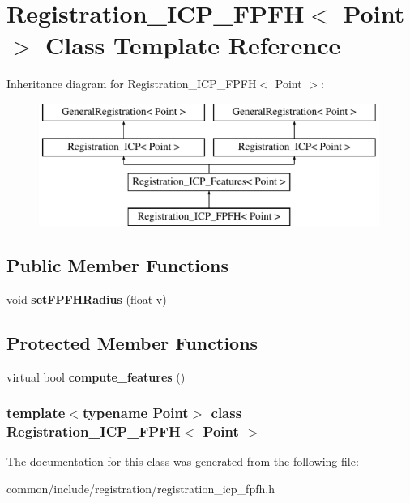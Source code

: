 \hypertarget{classRegistration__ICP__FPFH}{
\section{Registration\_\-ICP\_\-FPFH$<$ Point $>$ Class Template Reference}
\label{classRegistration__ICP__FPFH}
}
Inheritance diagram for Registration\_\-ICP\_\-FPFH$<$ Point $>$:\begin{figure}[H]
\begin{center}
\leavevmode
\includegraphics[height=4.000000cm]{classRegistration__ICP__FPFH}
\end{center}
\end{figure}
\subsection*{Public Member Functions}
\begin{DoxyCompactItemize}
\item 
\hypertarget{classRegistration__ICP__FPFH_ac6120c9fc679004668f6e4b16e31ac2b}{
void {\bfseries setFPFHRadius} (float v)}
\label{classRegistration__ICP__FPFH_ac6120c9fc679004668f6e4b16e31ac2b}

\end{DoxyCompactItemize}
\subsection*{Protected Member Functions}
\begin{DoxyCompactItemize}
\item 
\hypertarget{classRegistration__ICP__FPFH_afb888c0b3890e282cc6632f0db513ee7}{
virtual bool {\bfseries compute\_\-features} ()}
\label{classRegistration__ICP__FPFH_afb888c0b3890e282cc6632f0db513ee7}

\end{DoxyCompactItemize}
\subsubsection*{template$<$typename Point$>$ class Registration\_\-ICP\_\-FPFH$<$ Point $>$}



The documentation for this class was generated from the following file:\begin{DoxyCompactItemize}
\item 
common/include/registration/registration\_\-icp\_\-fpfh.h\end{DoxyCompactItemize}
